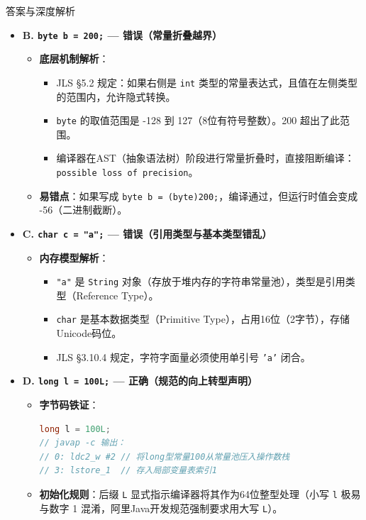 \documentclass[12pt, a4paper]{ctexart}
\begin{document}
\begin{enumerate}[label=\textbf{\arabic*.}]
\begin{bluebox}{答案与深度解析}
\begin{itemize}[leftmargin=*, nosep]
			      \item \textbf{B. \texttt{byte b = 200;} — 错误（常量折叠越界）}
			            \begin{itemize}[leftmargin=*, nosep]
				            \item \textbf{底层机制解析}：
				                  \begin{itemize}
					                  \item JLS §5.2 规定：如果右侧是 \texttt{int} 类型的常量表达式，且值在左侧类型的范围内，允许隐式转换。
					                  \item \texttt{byte} 的取值范围是 -128 到 127（8位有符号整数）。200 超出了此范围。
					                  \item 编译器在AST（抽象语法树）阶段进行常量折叠时，直接阻断编译：\texttt{possible loss of precision}。
				                  \end{itemize}
				            \item \textbf{易错点}：如果写成 \texttt{byte b = (byte)200;}，编译通过，但运行时值会变成 -56（二进制截断）。
			            \end{itemize}

			      \item \textbf{C. \texttt{char c = "a";} — 错误（引用类型与基本类型错乱）}
			            \begin{itemize}[leftmargin=*, nosep]
				            \item \textbf{内存模型解析}：
				                  \begin{itemize}
					                  \item \texttt{"a"} 是 \texttt{String} 对象（存放于堆内存的字符串常量池），类型是引用类型（Reference Type）。
					                  \item \texttt{char} 是基本数据类型（Primitive Type），占用16位（2字节），存储Unicode码位。
					                  \item JLS §3.10.4 规定，字符字面量必须使用单引号 \texttt{'a'} 闭合。
				                  \end{itemize}
			            \end{itemize}

			      \item \textbf{D. \texttt{long l = 100L;} — 正确（规范的向上转型声明）}
			            \begin{itemize}[leftmargin=*, nosep]
				            \item \textbf{字节码铁证}：
				                  \begin{lstlisting}[language=Java]
long l = 100L;
// javap -c 输出：
// 0: ldc2_w #2 // 将long型常量100从常量池压入操作数栈
// 3: lstore_1  // 存入局部变量表索引1
                \end{lstlisting}
				            \item \textbf{初始化规则}：后缀 \texttt{L} 显式指示编译器将其作为64位整型处理（小写 \texttt{l} 极易与数字 1 混淆，阿里Java开发规范强制要求用大写 \texttt{L}）。
			            \end{itemize}
		      \end{itemize}


\end{bluebox}
\end{enumerate}
\end{document}
